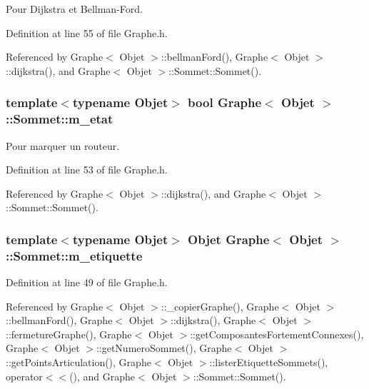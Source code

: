 Pour Dijkstra et Bellman-\/Ford. 



Definition at line 55 of file Graphe.h.



Referenced by Graphe$<$ Objet $>$::bellmanFord(), Graphe$<$ Objet $>$::dijkstra(), and Graphe$<$ Objet $>$::Sommet::Sommet().

\hypertarget{class_graphe_1_1_sommet_a8c825d391f276d2b862ec21bc3b28a37}{
\subsubsection[{m\_\-etat}]{\setlength{\rightskip}{0pt plus 5cm}template$<$typename Objet$>$ bool {\bf Graphe}$<$ Objet $>$::{\bf Sommet::m\_\-etat}}}
\label{class_graphe_1_1_sommet_a8c825d391f276d2b862ec21bc3b28a37}


Pour marquer un routeur. 



Definition at line 53 of file Graphe.h.



Referenced by Graphe$<$ Objet $>$::dijkstra(), and Graphe$<$ Objet $>$::Sommet::Sommet().

\hypertarget{class_graphe_1_1_sommet_a02d396509bdc1e8bff8e26504835d13e}{
\subsubsection[{m\_\-etiquette}]{\setlength{\rightskip}{0pt plus 5cm}template$<$typename Objet$>$ Objet {\bf Graphe}$<$ Objet $>$::{\bf Sommet::m\_\-etiquette}}}
\label{class_graphe_1_1_sommet_a02d396509bdc1e8bff8e26504835d13e}


Definition at line 49 of file Graphe.h.



Referenced by Graphe$<$ Objet $>$::\_\-copierGraphe(), Graphe$<$ Objet $>$::bellmanFord(), Graphe$<$ Objet $>$::dijkstra(), Graphe$<$ Objet $>$::fermetureGraphe(), Graphe$<$ Objet $>$::getComposantesFortementConnexes(), Graphe$<$ Objet $>$::getNumeroSommet(), Graphe$<$ Objet $>$::getPointsArticulation(), Graphe$<$ Objet $>$::listerEtiquetteSommets(), operator$<$$<$(), and Graphe$<$ Objet $>$::Sommet::Sommet().

